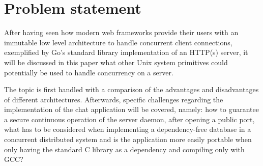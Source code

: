 \section{Problem statement}
After having seen how modern web frameworks provide their users with an immutable low level architecture to handle concurrent client connections, exemplified by Go's standard library implementation of an HTTP(s) server, it will be discussed in this paper what other Unix system primitives could potentially be used to handle concurrency on a server.

The topic is first handled with a comparison of the advantages and disadvantages of different architectures. Afterwards, specific challenges regarding the implementation of the chat application will be covered, namely: how to guarantee a secure continuous operation of the server daemon, after opening a public port, what has to be considered when implementing a dependency-free database in a concurrent distributed system and is the application more easily portable when only having the standard C library as a dependency and compiling only with GCC?